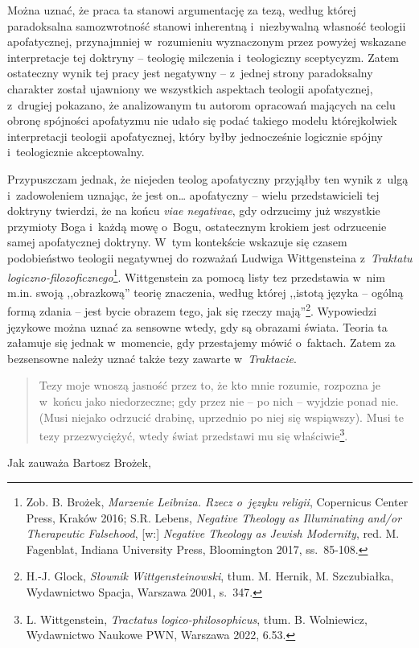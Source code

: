 Można uznać, że praca ta stanowi argumentację za tezą, według której paradoksalna samozwrotność stanowi inherentną i~niezbywalną własność teologii apofatycznej, przynajmniej w~rozumieniu wyznaczonym przez powyżej wskazane interpretacje tej doktryny -- teologię milczenia i~teologiczny sceptycyzm. Zatem ostateczny wynik tej pracy jest negatywny -- z~jednej strony paradoksalny charakter został ujawniony we wszystkich aspektach teologii apofatycznej, z~drugiej pokazano, że analizowanym tu autorom opracowań mających na celu obronę spójności apofatyzmu nie udało się podać takiego modelu którejkolwiek interpretacji teologii apofatycznej, który byłby jednocześnie logicznie spójny i~teologicznie akceptowalny.

Przypuszczam jednak, że niejeden teolog apofatyczny przyjąłby ten wynik z~ulgą i~zadowoleniem uznając, że jest on… apofatyczny -- wielu przedstawicieli tej doktryny twierdzi, że na końcu \textit{viae negativae}, gdy odrzucimy już wszystkie przymioty Boga i~każdą mowę o~Bogu, ostatecznym krokiem jest odrzucenie samej apofatycznej doktryny.
W~tym kontekście wskazuje się czasem podobieństwo teologii negatywnej do rozważań Ludwiga Wittgensteina z~\textit{Traktatu logiczno-filozoficznego}\footnote{Zob. B. Brożek, \textit{Marzenie Leibniza. Rzecz o~języku religii}, Copernicus Center Press, Kraków 2016; S.R. Lebens, \textit{Negative Theology as Illuminating and/or Therapeutic Falsehood}, [w:] \textit{Negative Theology as Jewish Modernity}, red. M. Fagenblat, Indiana University Press, Bloomington 2017, ss.~85-108.}.
Wittgenstein za pomocą listy tez przedstawia w~nim m.in. swoją ,,obrazkową'' teorię znaczenia, według której ,,istotą języka -- ogólną formą zdania -- jest bycie obrazem tego, jak się rzeczy mają''\footnote{H.-J. Glock, \textit{Słownik Wittgensteinowski}, tłum. M. Hernik, M. Szczubiałka, Wydawnictwo Spacja, Warszawa 2001, s.~347.}. Wypowiedzi językowe można uznać za sensowne wtedy, gdy są obrazami świata. Teoria ta załamuje się jednak w~momencie, gdy przestajemy mówić o~faktach. Zatem za bezsensowne należy uznać także tezy zawarte w~\textit{Traktacie}.

\begin{quote}
Tezy moje wnoszą jasność przez to, że kto mnie rozumie, rozpozna je w~końcu jako niedorzeczne; gdy przez nie -- po nich -- wyjdzie ponad nie. (Musi niejako odrzucić drabinę, uprzednio po niej się wspiąwszy). Musi te tezy przezwyciężyć, wtedy świat przedstawi mu się właściwie\footnote{L. Wittgenstein, \textit{Tractatus logico-philosophicus}, tłum. B. Wolniewicz, Wydawnictwo Naukowe PWN, Warszawa 2022, 6.53.}.
\end{quote}
Jak zauważa Bartosz Brożek,

